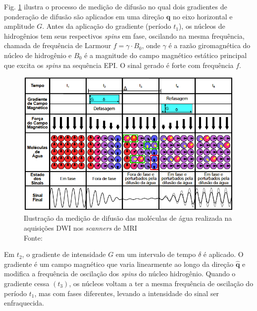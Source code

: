 \documentclass[
    12pt,                %
    oneside,            %
    a4paper,            %
    english,            %
    french,                %
    spanish,            %
    brazil                %
    ]{abntex2}
\begin{document}
Fig. \ref{fig::pgse_ilustrado} ilustra o processo de medição de difusão no qual dois gradientes de ponderação de difusão são aplicados em uma direção $\mathbf{\hat{q}}$ no eixo horizontal e amplitude $G$. Antes da aplicação do gradiente (período $t_1$), os núcleos de hidrogênios tem seus respectivos \textit{spins} em fase, oscilando na mesma frequência, chamada de frequência de Larmour $f = \gamma \cdot B_0$, onde $\gamma$ é a razão giromagnética do núcleo de hidrogênio e $B_0$ é a magnitude do campo magnético estático principal que excita os \textit{spins} na sequência EPI. O sinal gerado é forte com frequência $f$.

\begin{figure}[ht]

    \centering
    \includegraphics[width=.8\linewidth, angle=0]{figs/HARDI/pgse2.png}
    \caption{Ilustração da medição de difusão das moléculas de água realizada na aquisições DWI nos \textit{scanners} de MRI \\
    Fonte: \cite{voltoline2016}
    }
    \label{fig::pgse_ilustrado}
   \hspace{1pt}
\end{figure}

Em $t_2$, o gradiente de intensidade $G$ em um intervalo de tempo $\delta$ é aplicado. O gradiente é um campo magnético que varia linearmente ao longo da direção $\mathbf{\hat{q}}$ e modifica a frequência de oscilação dos \textit{spins} do núcleo hidrogênio. Quando o gradiente cessa $(t_3)$, os núcleos voltam a ter a mesma frequência de oscilação do período $t_1$, mas com fases diferentes, levando a intensidade do sinal ser enfraquecida.
\end{document}
